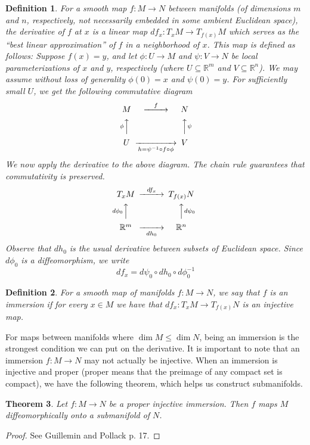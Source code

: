 \documentclass{amsart}          %
\newtheorem{theorem}{Theorem}
\newtheorem{definition}[theorem]{Definition}
\newcommand{\R}{\mathbb R}
\begin{document}
\begin{definition}
For  a smooth map $f\colon M\rightarrow N$ between manifolds (of dimensions $m$ and $n$, respectively, not necessarily embedded in some ambient Euclidean space), the \emph{derivative of $f$ at $x$} is a linear map $df_x\colon T_xM\rightarrow T_{f(x)}M$ which serves as the ``best linear approximation'' of $f$ in a neighborhood of $x$. This map is defined as follows: Suppose $f(x)=y$, and let $\phi\colon U\rightarrow M$ and $\psi\colon V\rightarrow N$ be local parameterizations of $x$ and $y$, respectively (where $U\subseteq \R^m$ and $V\subseteq \R^n$). We may assume without loss of generality $\phi(0)=x$ and $\psi(0)=y$. For sufficiently small $U$, we get the following commutative diagram
$$
\begin{CD}
M @>f>> N\\
@A\phi AA  @AA\psi A\\
U @>>h=\psi^{-1}\circ f\circ \phi> V
\end{CD}
$$
We now apply the derivative to the above diagram. The chain rule guarantees that commutativity is preserved.
$$
\begin{CD}
T_xM @>df_x>> T_{f(x)}N\\
@Ad\phi_0 AA  @AAd\psi_0 A\\
\R^m @>>dh_0> \R^n
\end{CD}
$$
Observe that $dh_0$ is the usual derivative between subsets of Euclidean space. Since $d\phi_0$ is a diffeomorphism, we write
\[df_x=d\psi_0\circ dh_0\circ d\phi_0^{-1}\]
\end{definition}
\begin{definition}
For a smooth map of manifolds $f\colon M\rightarrow N$, we say that $f$ is an \emph{immersion} if for every $x\in M$ we have that $df_x\colon T_xM\rightarrow T_{f(x)}N$ is an injective map.
\end{definition}
For maps between manifolds where $\dim M\leq \dim N$, being an immersion is the strongest condition we can put on the derivative. It is important to note that an immersion $f:M\to N$ may not actually be injective. When an immersion is injective and proper (proper means that the preimage of any compact set is compact), we have the following theorem, which helps us construct submanifolds.
\begin{theorem}
Let $f\colon M\rightarrow N$ be a proper injective immersion. Then $f$ maps $M$ diffeomorphically onto a submanifold of $N$.
\end{theorem}
\begin{proof}
	See Guillemin and Pollack p. 17.
\end{proof}	
\end{document}
